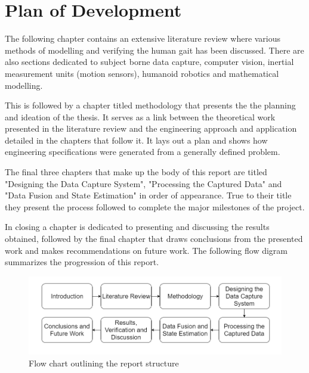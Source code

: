  
\section{Plan of Development}
The following chapter contains an extensive literature review where various methods of modelling and verifying the human gait has been discussed. There are also sections dedicated to subject borne data capture, computer vision, inertial measurement units (motion sensors), humanoid robotics and mathematical modelling.

This is followed by a chapter titled methodology that presents the the planning and ideation of the thesis. It serves as a link between the theoretical work presented in the literature review and the engineering approach and application detailed in the chapters that follow it. It lays out a plan and shows how engineering specifications were generated from a generally defined problem. 

The final three chapters that make up the body of this report are titled "Designing the Data Capture System", "Processing the Captured Data" and "Data Fusion and State Estimation" in order of appearance. True to their title they present the process followed to complete the major milestones of the project.

In closing a chapter is dedicated to presenting and discussing the results obtained, followed by the final chapter that draws conclusions from the presented work and makes recommendations on future work. The following flow digram summarizes the progression of this report.

\begin{figure}[!ht] 
\captionsetup{width=\linewidth, font=small}  
\includegraphics[width=\linewidth]{figures/introflow.png}
\caption{Flow chart outlining the report structure}
\label{fig:introflow}
\end{figure}